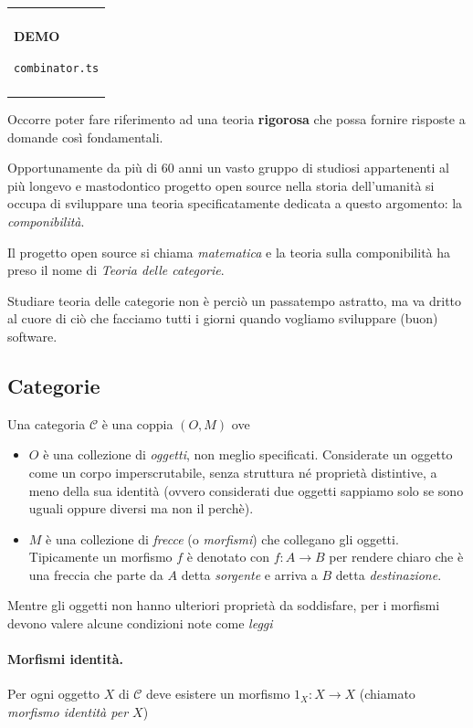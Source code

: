 \documentclass[12pt]{article}
\newenvironment{boxed}
    {\begin{center}
    \begin{tabular}{|p{0.9\textwidth}|}
    \hline\\
    }
    {
    \\\\\hline
    \end{tabular}
    \end{center}
    }
\begin{document}
\begin{boxed}
\begin{center}
\textbf{DEMO}

\texttt{combinator.ts}
\end{center}
\end{boxed}

Occorre poter fare riferimento ad una teoria \textbf{rigorosa} che possa fornire risposte a domande così fondamentali.

Opportunamente da più di 60 anni un vasto gruppo di studiosi appartenenti al più longevo e mastodontico progetto open source nella storia
dell'umanità si occupa di sviluppare una teoria specificatamente dedicata a questo argomento: la \emph{componibilità}.

Il progetto open source si chiama \emph{matematica} e la teoria sulla componibilità ha preso il nome di \emph{Teoria delle categorie}.

Studiare teoria delle categorie non è perciò un passatempo astratto, ma va dritto al cuore di ciò che facciamo tutti i giorni quando vogliamo
sviluppare (buon) software.

\subsection{Categorie}

Una categoria $\mathcal{C}$ è una coppia $(O, M)$ ove
\begin{itemize}
  \item $O$ è una collezione di \emph{oggetti}, non meglio specificati. Considerate un oggetto come un corpo imperscrutabile,
  senza struttura né proprietà distintive, a meno della sua identità (ovvero considerati due oggetti sappiamo solo se sono uguali oppure diversi
  ma non il perchè).
  \item $M$ è una collezione di \emph{frecce} (o \emph{morfismi}) che collegano gli oggetti. Tipicamente un morfismo $f$ è denotato con $f: A \rightarrow B$
  per rendere chiaro che è una freccia che parte da $A$ detta \emph{sorgente} e arriva a $B$ detta \emph{destinazione}.
\end{itemize}

Mentre gli oggetti non hanno ulteriori proprietà da soddisfare, per i morfismi devono valere alcune condizioni note come \emph{leggi}\\

\paragraph{Morfismi identità.} Per ogni oggetto $X$ di $\mathcal{C}$ deve esistere un morfismo $1_X: X \rightarrow X$ (chiamato \emph{morfismo identità per $X$})\\
\end{document}
